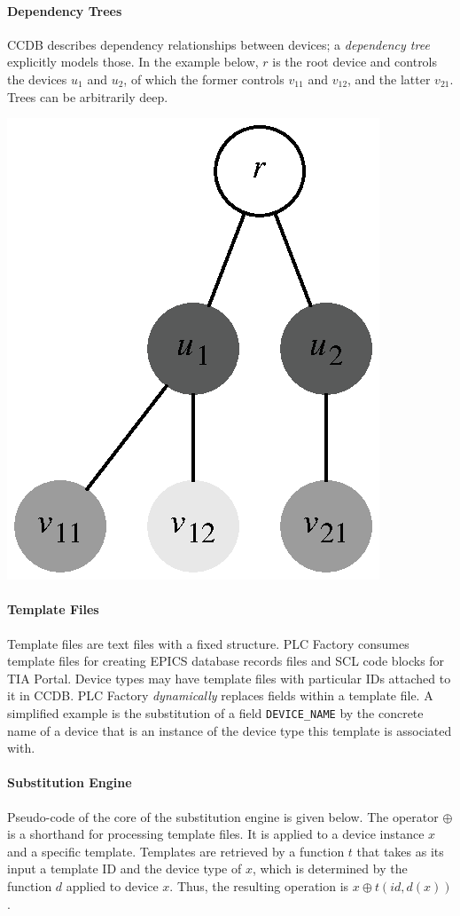 \documentclass[portrait,final,a0paper,fontscale=0.277]{baposter}
\begin{document}
\begin{poster}
{\begin{multicols}{2}
\paragraph{Dependency Trees}
CCDB describes dependency relationships between devices; a \emph{dependency tree} explicitly models those. In the example below, $r$ is the root device and controls the devices $u_1$ and $u_2$, of which the former controls $v_{11}$ and $v_{12}$, and the latter $v_{21}$. Trees can be arbitrarily deep.

\vspace{5mm}
\includegraphics[width=0.50\linewidth]{figures/deviceTreeCropped.eps}


\paragraph{Template Files}
Template files are text files with a fixed structure. PLC Factory consumes template files for creating EPICS database records files and SCL code blocks for TIA Portal. Device types may have template files with particular IDs attached to it in CCDB. PLC Factory \emph{dynamically} replaces fields within a template file. A simplified example is the substitution of a field \texttt{DEVICE\_NAME} by the concrete name of a device that is an instance of the device type this template is associated with.



\paragraph{Substitution Engine}
Pseudo-code of the core of the substitution engine is given below. The operator $\oplus$ is a shorthand for processing template files. It is applied to a device instance $x$ and a specific template. Templates are retrieved by a function $t$ that takes as its input a template ID and the device type of $x$, which is determined by the function $d$ applied to device $x$. Thus, the resulting operation is $x \oplus t(\mathit{id}, d(x))$.


\end{multicols}}
\end{poster}
\end{document}
